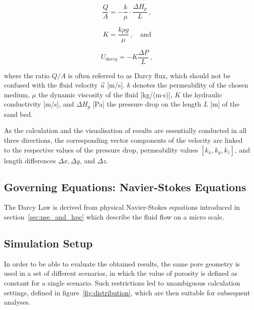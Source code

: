 \documentclass[10pt, conference]{IEEEtran}
\begin{document}
\begin{equation}
\frac{Q}{A} = -\frac{k}{\mu} \cdot \frac{\Delta H_{p}}{L}\,,
\end{equation}

\begin{equation}
K = \frac{k \rho g}{\mu}\,,\quad\text{and}
\end{equation}

\begin{equation}
U_{darcy} = -K \frac{\Delta P}{L}\,,
\end{equation}

where the ratio $Q/A$ is often referred to as Darcy flux, which should not be confused with the fluid velocity $\vec u$ [m/s]. $k$ denotes the permeability of the chosen medium, $\mu$ the
dynamic viscosity of the fluid [kg/(m$\cdot$s)], $K$ the hydraulic conductivity [m/s], and $\Delta H_{p}$ [Pa] the pressure drop on the length $L$ [m] of the sand bed.

As the calculation and the visualisation of results are essentially conducted in all three directions, the corresponding vector components of the velocity are linked to the respective values of
the pressure drop, permeability values $\left[ k_{x}, k_{y}, k_{z} \right]$, and length differences $\Delta x, \Delta y$, and $\Delta z $.


\subsection{Governing Equations: Navier-Stokes Equations}

The Darcy Law is derived from physical Navier-Stokes equations introduced in section~\ref{sec:nse_and_hpc} which describe the fluid flow on a micro scale.

\subsection{Simulation Setup}

In order to be able to evaluate the obtained results, the same pore geometry is used in a set of different scenarios, in which the value of porosity is defined as constant for a single scenario.
Such restrictions led to unambiguous calculation settings, defined in figure~\ref{fig:distribution}, which are then suitable for subsequent analyses.
\end{document}
